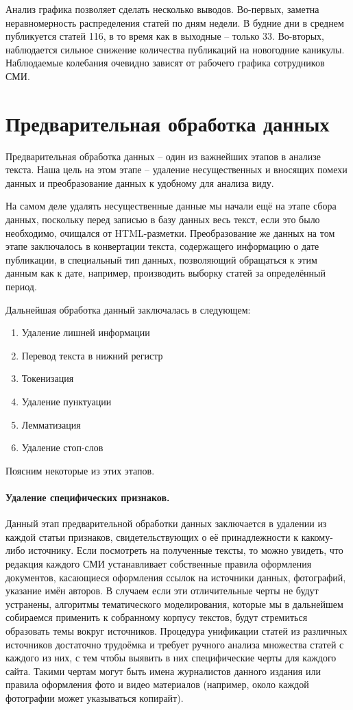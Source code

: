 Анализ графика позволяет сделать несколько выводов. Во-первых, заметна неравномерность распределения статей по дням недели. В будние дни в среднем публикуется статей 116, в то время как в выходные -- только 33. Во-вторых, наблюдается сильное снижение количества публикаций на новогодние каникулы. Наблюдаемые колебания очевидно зависят от рабочего графика сотрудников СМИ.

\section{Предварительная обработка данных}

Предварительная обработка данных -- один из важнейших этапов в анализе текста. Наша цель на этом этапе -- удаление несущественных и вносящих помехи данных и преобразование данных к удобному для анализа виду.

На самом деле удалять несущественные данные мы начали ещё на этапе сбора данных, поскольку перед записью в базу данных весь текст, если это было необходимо, очищался от HTML-разметки. Преобразование же данных на том этапе заключалось в конвертации текста, содержащего информацию о дате публикации, в специальный тип данных, позволяющий обращаться к этим данным как к дате, например, производить выборку статей за определённый период.

Дальнейшая обработка данный заключалась в следующем:

\begin{enumerate}
\item Удаление лишней информации
\item Перевод текста в нижний регистр
\item Токенизация
\item Удаление пунктуации
\item Лемматизация
\item Удаление стоп-слов
\end{enumerate}
Поясним некоторые из этих этапов.

\paragraph{Удаление специфических признаков.}
Данный этап предварительной обработки данных заключается в удалении из каждой статьи признаков, свидетельствующих о её принадлежности к какому-либо источнику. Если посмотреть на полученные тексты, то можно увидеть, что редакция каждого СМИ устанавливает собственные правила оформления документов, касающиеся оформления ссылок на источники данных, фотографий, указание имён авторов. В случаем если эти отличительные черты не будут устранены, алгоритмы тематического моделирования, которые мы в дальнейшем собираемся применить к собранному корпусу текстов, будут стремиться образовать темы вокруг источников. Процедура унификации статей из различных источников достаточно трудоёмка и требует ручного анализа множества статей с каждого из них, с тем чтобы выявить в них специфические черты для каждого сайта. Такими чертам могут быть имена журналистов данного издания или правила оформления фото и видео материалов (например, около каждой фотографии может указываться копирайт).


